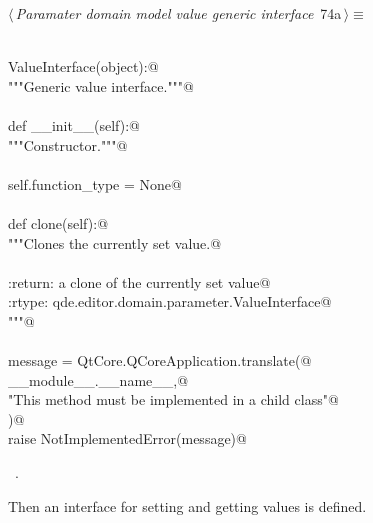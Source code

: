 \documentclass[
    a4paper,      %
    10pt,         %
    openright,    %
    notitlepage,  %
    parskip=half, %
]{scrreprt}       %
\theoremstyle{definition}                    %
\begin{document}
\begin{flushleft} \small
\begin{minipage}{\linewidth}\label{scrap120}\raggedright\small
{} $\langle\,${\itshape Paramater domain model value generic interface}\nobreak\ {\footnotesize {74a}}$\,\rangle\equiv$
\vspace{-1exm}
\begin{list}{}{} \item
\mbox{}\lstinline@@\\
\mbox{}\lstinline@class ValueInterface(object):@\\
\mbox{}\lstinline@    """Generic value interface."""@\\
\mbox{}\lstinline@@\\
\mbox{}\lstinline@    def __init__(self):@\\
\mbox{}\lstinline@        """Constructor."""@\\
\mbox{}\lstinline@@\\
\mbox{}\lstinline@        self.function_type = None@\\
\mbox{}\lstinline@@\\
\mbox{}\lstinline@    def clone(self):@\\
\mbox{}\lstinline@        """Clones the currently set value.@\\
\mbox{}\lstinline@@\\
\mbox{}\lstinline@        :return: a clone of the currently set value@\\
\mbox{}\lstinline@        :rtype:  qde.editor.domain.parameter.ValueInterface@\\
\mbox{}\lstinline@        """@\\
\mbox{}\lstinline@@\\
\mbox{}\lstinline@        message = QtCore.QCoreApplication.translate(@\\
\mbox{}\lstinline@            __module__.__name__,@\\
\mbox{}\lstinline@            "This method must be implemented in a child class"@\\
\mbox{}\lstinline@        )@\\
\mbox{}\lstinline@        raise NotImplementedError(message)@{\NWsep}
\end{list}
\vspace{-1.5ex}
\footnotesize
\begin{list}{}{\setlength{\itemsep}{-\parsep}\setlength{\itemindent}{-\leftmargin}}
\item \NWtxtMacroRefIn\ .

\item{}
\end{list}
\end{minipage}\vspace{4ex}
\end{flushleft}
Then an interface for setting and getting values is defined.
\end{document}
